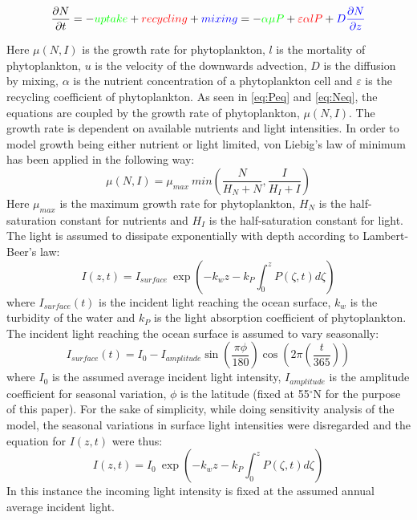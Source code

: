 \begin{equation} \label{eq:Neq}
    \frac{\partial N}{\partial t} = - \textcolor{green}{uptake} + \textcolor{red}{recycling} + \textcolor{blue}{mixing} = - \textcolor{green}{\alpha \mu P} + \textcolor{red}{\varepsilon \alpha lP} + \textcolor{blue}{D\frac{\partial N}{\partial z}}
\end{equation}

Here $\mu(N,I)$ is the growth rate for phytoplankton, $l$ is the mortality of phytoplankton, $u$ is the velocity of the downwards advection, $D$ is the diffusion by mixing, $\alpha$ is the nutrient concentration of a phytoplankton cell and $\varepsilon$ is the recycling coefficient of phytoplankton.
As seen in \cref{eq:Peq} and \cref{eq:Neq}, the equations are coupled by the growth rate of phytoplankton, $\mu(N,I)$. The growth rate is dependent on available nutrients and light intensities. In order to model growth being either nutrient or light limited, von Liebig's law of minimum has been applied in the following way:
\begin{equation} \label{eq:Growtheq}
    \mu(N,I) = \mu_{max} \: min\left( \frac{N}{H_N + N},\frac{I}{H_I + I}\right)
\end{equation}
Here $\mu_{max}$ is the maximum growth rate for phytoplankton, $H_N$ is the half-saturation constant for nutrients and $H_I$ is the half-saturation constant for light.
The light is assumed to dissipate exponentially with depth according to Lambert-Beer's law:
\begin{equation} \label{eq:Ieq}
    I(z,t) = I_{surface} \: \exp\left(- k_wz - k_P \int_{0}^{z} P(\zeta, t)d\zeta \right)
\end{equation}
where $I_{surface}(t)$ is the incident light reaching the ocean surface, $k_w$ is the turbidity of the water and $k_P$ is the light absorption coefficient of phytoplankton. The incident light reaching the ocean surface is assumed to vary seasonally:
\begin{equation} \label{eq:Isurfeq}
    I_{surface}(t) = I_0 - I_{amplitude}\sin{\left(\frac{\pi \phi}{180}\right)}\cos{\left(2\pi\left(\frac{t}{365}\right)\right)}
\end{equation}
where $I_0$ is the assumed average incident light intensity, $I_{amplitude}$ is the amplitude coefficient for seasonal variation, $\phi$ is the latitude (fixed at 55$^\circ$N for the purpose of this paper).
For the sake of simplicity, while doing sensitivity analysis of the model, the seasonal variations in surface light intensities were disregarded and the equation for $I(z,t)$ were thus:
\begin{equation} \label{eq:Ieq2}
    I(z,t) = I_0 \: \exp\left(- k_wz - k_P \int_{0}^{z} P(\zeta, t)d\zeta \right)
\end{equation}
In this instance the incoming light intensity is fixed at the assumed annual average incident light.


